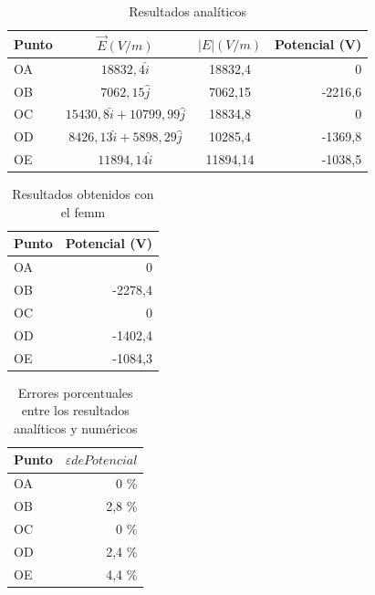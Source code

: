\documentclass{article}
\begin{document}
    \begin{table}[H]
	\centering
	\begin{tabular}{|l | c | c | r|}
    	\hline
        Punto & $\overrightarrow{E} (V/m)$ & $|E| (V/m)$ &Potencial (V) \\ \hline
        OA & $ 18832,4 \hat{i} $ & 18832,4 & 0 \\
        OB & $ 7062,15 \hat{j} $ & 7062,15 & -2216,6 \\
        OC & $ 15430,8 \hat{i} +  10799,99 \hat{j} $ & 18834,8 & 0 \\
        OD & $ 8426,13 \hat{i} +  5898,29 \hat{j} $ & 10285,4 & -1369,8\\
        OE & $ 11894,14 \hat{i} $ & 11894,14 & -1038,5\\ \hline
	\end{tabular}
    \caption{Resultados analíticos}
    \end{table}
    
    \begin{table}[H]
	\centering
	\begin{tabular}{|l | r|}
    	\hline
        Punto & Potencial (V) \\ \hline
        OA & 0  \\  %
        OB & -2278,4 \\ 
        OC & 0 \\ 
        OD & -1402,4 \\ 
        OE & -1084,3 \\ \hline %
	\end{tabular}
    \caption{Resultados obtenidos con el femm}
    \end{table}
    
         \begin{table}[H]
	\centering
	\begin{tabular}{|l | r|}
    	\hline
        Punto & $\varepsilon de Potencial$\\ \hline
        OA & 0 \%\\
        OB & 2,8 \% \\
        OC & 0 \%\\
        OD & 2,4 \%\\
        OE & 4,4 \%\\ \hline
	\end{tabular}
    \caption{Errores porcentuales entre los resultados analíticos y numéricos}
    \end{table}
    
\end{document}
